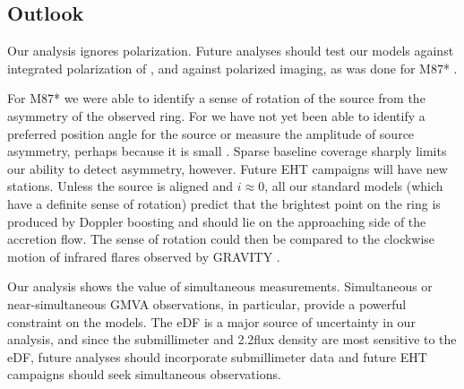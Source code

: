 


\subsection{Outlook}\label{sec:future}

Our analysis ignores polarization.  Future analyses should test our models against integrated polarization of \sgra \citep{2021ApJ...910L..14G}, and against polarized imaging, as was done for M87* .

For M87* we were able to identify a sense of rotation of the source from the asymmetry of the observed ring.  For \sgra we have not yet been able to identify a preferred position angle for the source or measure the amplitude of source asymmetry, perhaps because it is small .  Sparse baseline coverage sharply limits our ability to detect asymmetry, however.  Future EHT campaigns will have new stations.  Unless the source is aligned and $i \approx 0$, all our standard models (which have a definite sense of rotation) predict that the brightest point on the ring is produced by Doppler boosting and should lie on the approaching side of the accretion flow.  The sense of rotation could then be compared to the clockwise motion of infrared flares observed by GRAVITY \citep{2018A&A...618L..10G}.

Our analysis shows the value of simultaneous measurements.  Simultaneous or near-simultaneous GMVA observations, in particular, provide a powerful constraint on the models.  The eDF is a major source of uncertainty in our analysis, and since the submillimeter and 2.2\um flux density are most sensitive to the eDF, future analyses should incorporate submillimeter data and future EHT campaigns should seek simultaneous observations.

